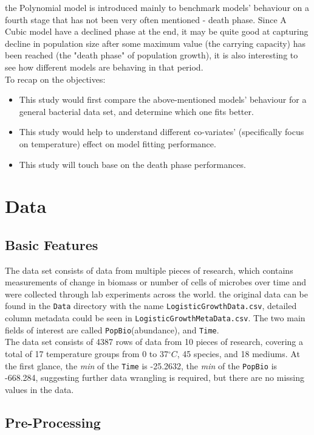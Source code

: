 \documentclass[11pt]{article}
\begin{document}
the Polynomial model is introduced mainly to benchmark models' behaviour on a fourth stage that has not been very often mentioned - death phase. Since A Cubic model have a declined phase at the end, it may be quite good at capturing decline in population size after some maximum value (the carrying capacity) has been reached (the "death phase" of population growth)\parencite{buchanan1918life}, it is also interesting to see how different models are behaving in that period.\\
To recap on the objectives:
\begin{itemize}
  \item This study would first compare the above-mentioned models' behaviour for a general bacterial data set, and determine which one fits better.
  \item This study would help to understand different co-variates' (specifically focus on temperature) effect on model fitting performance.
  \item This study will touch base on the death phase performances.
\end{itemize}


\section{Data}
\subsection{Basic Features}
The data set consists of data from multiple pieces of research, which contains measurements of change in biomass or number of cells of microbes over time and were collected through lab experiments across the world. the original data can be found in the \verb|Data| directory with the name \verb|LogisticGrowthData.csv|, detailed column metadata could be seen in \verb|LogisticGrowthMetaData.csv|. The two main fields of interest are called \verb|PopBio|(abundance), and \verb|Time|.\\
The data set consists of 4387 rows of data from 10 pieces of research, covering a total of 17 temperature groups from 0 to 37$^\circ C$, 45 species, and 18 mediums. At the first glance, the \emph{min} of the \verb|Time| is -25.2632, the \emph{min} of the \verb|PopBio| is -668.284, suggesting further data wrangling is required, but there are no missing values in the data.
\subsection{Pre-Processing}
\end{document}
